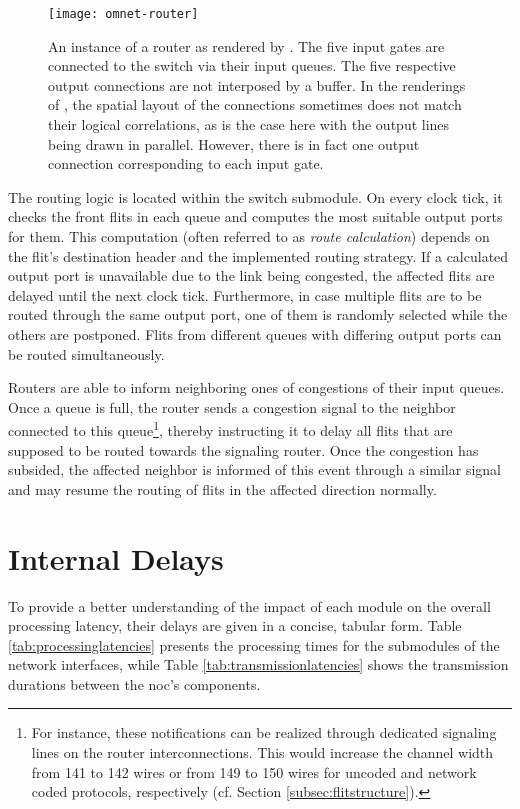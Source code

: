 \begin{figure}
    \centering
    \texttt{[image: omnet-router]}
    \caption[Simulator view of the router]{An instance of a router as rendered by \omnet{}. The five input gates are connected to the switch via their
    input queues. The five respective output connections are not interposed by a buffer. In the renderings of \omnet{}, the spatial layout of the
    connections sometimes does not match their logical correlations, as is the case here with the output lines being drawn in parallel. However, there is
    in fact one output connection corresponding to each input gate.}
    \label{fig:omnetrouter}
\end{figure}

The routing logic is located within the switch submodule. On every clock tick, it checks the front flits in each queue and computes the most suitable
output ports for them. This computation (often referred to as \textit{route calculation}) depends on the flit's destination header and the implemented routing
strategy. If a calculated output port is unavailable due to the link being congested, the affected flits are delayed until the next clock tick.
Furthermore, in case multiple flits are to be routed through the same output port, one of them is randomly selected while the others are postponed.
Flits from different queues with differing output ports can be routed simultaneously.

Routers are able to inform neighboring ones of congestions of their input queues. Once a queue is full, the router sends a congestion signal to the
neighbor connected to this queue\footnote{For instance, these notifications can be realized through dedicated signaling lines on the router
interconnections. This would increase the channel width from 141 to 142 wires or from 149 to 150 wires for uncoded and network coded protocols,
respectively (cf. Section \ref{subsec:flitstructure}).}, thereby instructing it to delay all flits that are supposed to be routed towards the
signaling router. Once the congestion has subsided, the affected neighbor is informed of this event through a similar signal and may resume the
routing of flits in the affected direction normally.

\section{Internal Delays}\label{sec:internaldelays}
To provide a better understanding of the impact of each module on the overall processing latency, their delays are given in a concise, tabular form.
Table \ref{tab:processinglatencies} presents the processing times for the submodules of the network interfaces, while Table
\vref{tab:transmissionlatencies} shows the transmission durations between the \gls{noc}'s components.

